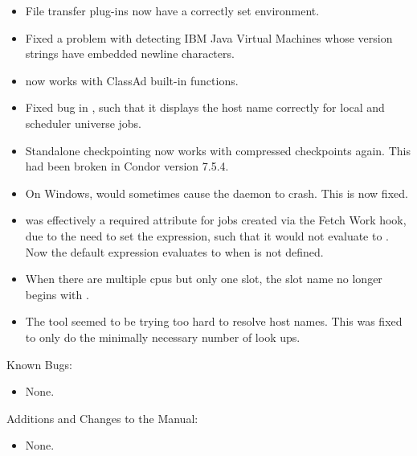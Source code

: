 \begin{itemize}
\item File transfer plug-ins now have a correctly set environment.

\item Fixed a problem with detecting IBM Java Virtual Machines whose
version strings have embedded newline characters.

\item {}  now works with ClassAd built-in functions.

\item Fixed bug in  , such that it displays
the host name correctly for local and scheduler universe jobs.

\item Standalone checkpointing now works with compressed checkpoints again.
This had been broken in Condor version 7.5.4.

\item On Windows,  would sometimes cause the
 daemon to crash.  This is now fixed.

\item {} was effectively a required attribute for
  jobs created via the Fetch Work hook,
  due to the need to set the 
  expression, such that it would not evaluate to .
  Now the default  expression
  evaluates to  when  is not defined.

\item When there are multiple cpus but only one slot, the slot name no
longer begins with .

\item The tool  seemed to be trying too hard to resolve
host names. This was fixed to only do the minimally necessary 
number of look ups.

\end{itemize}

\noindent Known Bugs:

\begin{itemize}

\item None.

\end{itemize}

\noindent Additions and Changes to the Manual:

\begin{itemize}

\item None.

\end{itemize}

